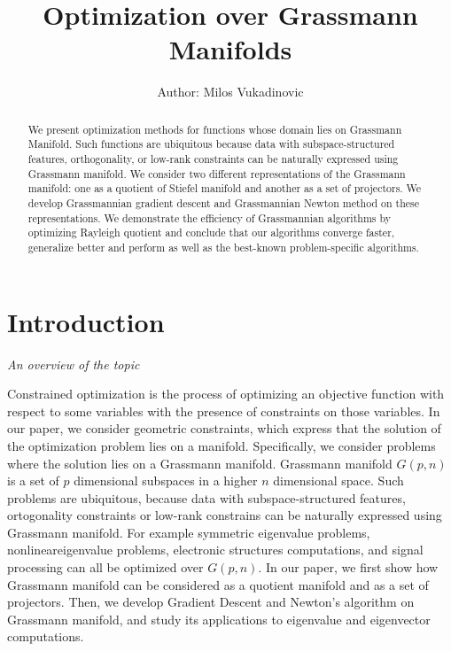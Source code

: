 \documentclass[11pt,a4paper]{report}
\title{Optimization over Grassmann Manifolds}
\author{Author: Milos Vukadinovic}
\date{\parbox{\linewidth}{\centering%
  \endgraf\bigskip
  Advisor: Peter Dalakov \endgraf\medskip
  \bigskip
  Department\ of Mathematics,  \endgraf
  American University in Bulgaria \endgraf
  \bigskip
  \today}}
\begin{document}
\maketitle

\begin{abstract}
We present optimization methods for functions whose domain lies on Grassmann Manifold.
Such functions are ubiquitous because data with subspace-structured features, orthogonality, or low-rank constraints can be naturally expressed using Grassmann manifold.
We consider two different representations of the Grassmann manifold: one as a quotient of Stiefel manifold and another as a set of projectors.
We develop Grassmannian gradient descent and Grassmannian Newton method on these representations.
We demonstrate the efficiency of Grassmannian algorithms by optimizing Rayleigh quotient and conclude that our algorithms converge faster, generalize better and perform as well as the best-known problem-specific algorithms. 
\end{abstract}

\setcounter{tocdepth}{1}
\tableofcontents
\chapter{Introduction}
\textit{An overview of the topic} \newline

Constrained optimization is the process of optimizing an objective function with respect to some variables with the presence of constraints on those variables.
In our paper, we consider geometric constraints, which express that the solution of the optimization problem lies on a manifold.
Specifically, we consider problems where the solution lies on a Grassmann manifold.
Grassmann manifold $G(p,n)$ is a set of $p$ dimensional subspaces in a higher $n$ dimensional space.
Such problems are ubiquitous, because data with subspace-structured features, ortogonality constraints or low-rank constrains can be naturally expressed using Grassmann manifold.
For example symmetric eigenvalue problems, nonlineareigenvalue problems, electronic structures computations, and signal processing can all be optimized over $G(p,n)$.
In our paper, we first show how Grassmann manifold can be considered as a quotient manifold and as a set of projectors. Then, we develop Gradient Descent and Newton's algorithm on Grassmann manifold, and study its applications to eigenvalue and eigenvector computations.
\end{document}
